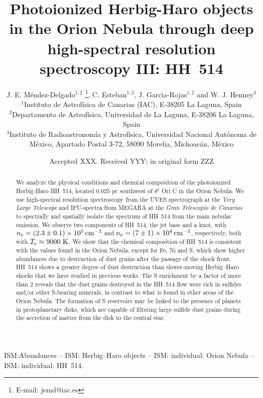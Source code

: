 \documentclass[fleqn,usenatbib]{mnras}
\title[HH~514 in the Orion Nebula]{Photoionized Herbig-Haro objects in the Orion Nebula through deep high-spectral resolution spectroscopy III: HH~514}
\author[J. E. M\'endez-Delgado et al.]
{J. E. M\'endez-Delgado$^{1,2}$ \thanks{E-mail: jemd@iac.es},
C. Esteban$^{1,2}$, J. Garc{\'{\i}}a-Rojas$^{1,2}$ and W. J. Henney$^{3}$  
\\
$^{1}$Instituto de Astrof\'isica de Canarias (IAC), E-38205 La Laguna, Spain\\
$^{2}$Departamento de Astrof\'isica, Universidad de La Laguna, E-38206 La Laguna, Spain\\
$^{3}$Instituto de Radioastronom\'ia y Astrof\'isica, Universidad Nacional Aut\'onoma de M\'exico, Apartado Postal 3-72, 58090 Morelia, Michoac\'an, M\'exico}
\date{Accepted XXX. Received YYY; in original form ZZZ}
\begin{document}
\label{firstpage}
\pagerange{\pageref{firstpage}--\pageref{lastpage}}
\maketitle

\begin{abstract}
  We analyze the physical conditions and chemical composition of the photoionized Herbig-Haro HH~514, located $0.025 \text{\ pc}$ southwest of $\theta^1$ Ori C in the Orion Nebula. We use high-spectral resolution spectroscopy from the UVES spectrograph at the \textit{Very Large Telescope} and IFU-spectra from MEGARA at the \textit{Gran Telescopio de Canarias} to spectrally and spatially isolate the spectrum of HH~514 from the main nebular emission. We observe two components of HH~514, the jet base and a knot, with $n_{\rm e}= (2.3 \pm 0.1) \times 10^5 \text{\,cm}^{-3}$ and $n_{\rm e}= (7 \pm 1) \times 10^4 \text{\,cm}^{-3}$, respectively, both with $T_{\rm e}\approx 9000 \text{ K}$. We show that the chemical composition of HH~514 is consistent with the values found in the Orion Nebula, except for Fe, Ni and S, which show higher abundances due to  destruction of dust grains after the passage of the shock front.
  HH~514 shows a greater degree of dust destruction than slower-moving Herbig--Haro shocks that we have studied in previous works.
The S enrichment by a factor of more than 2 reveals that the dust grains destroyed in the HH~514 flow were rich in sulfides and/or other S-bearing minerals, in contrast to what is found in other areas of the Orion Nebula. The formation of S reservoirs may be linked to the presence of planets in protoplanetary disks, which are capable of filtering large sulfide dust grains during the accretion of matter from the disk to the central star. %
\end{abstract}

\begin{keywords}
ISM:Abundances – ISM: Herbig–Haro objects – ISM: individual:
Orion Nebula – ISM: individual: HH~514.
\end{keywords}
\end{document}
